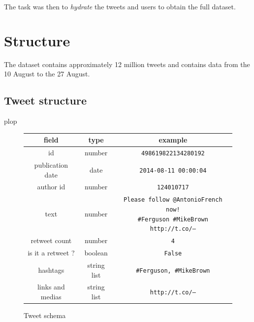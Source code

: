 \documentclass[a4paper,12pt]{report}
\begin{document}
The task was then to \emph{hydrate} the tweets and users to obtain the full dataset.

\newpage

\section{Structure}
The dataset contains approximately 12 million tweets and contains data from the 10 August to the 27 August.

\subsection{Tweet structure}
plop
\begin{figure}[h!]
\centering
\begin{tabular}{c|c|c}
field & type & example\\
\midrule
id & number & \texttt{498619822134280192} \\ \hline
publication date & date & \texttt{2014-08-11 00:00:04} \\ \hline
author id & number & \texttt{124010717} \\ \hline
text & number & \pbox{9cm}{\vspace*{5pt}\texttt{Please follow @AntonioFrench now! \newline \#Ferguson \#MikeBrown http://t.co/---}\vspace*{5pt}} \\ \hline
retweet count & number & \texttt{4} \\ \hline
is it a retweet ? & boolean & \texttt{False} \\ \hline
hashtags & string list & \texttt{\#Ferguson, \#MikeBrown} \\ \hline
links and medias & string list & \texttt{http://t.co/---} \\ \hline
\end{tabular}
\caption{Tweet schema}
\end{figure}
\end{document}
